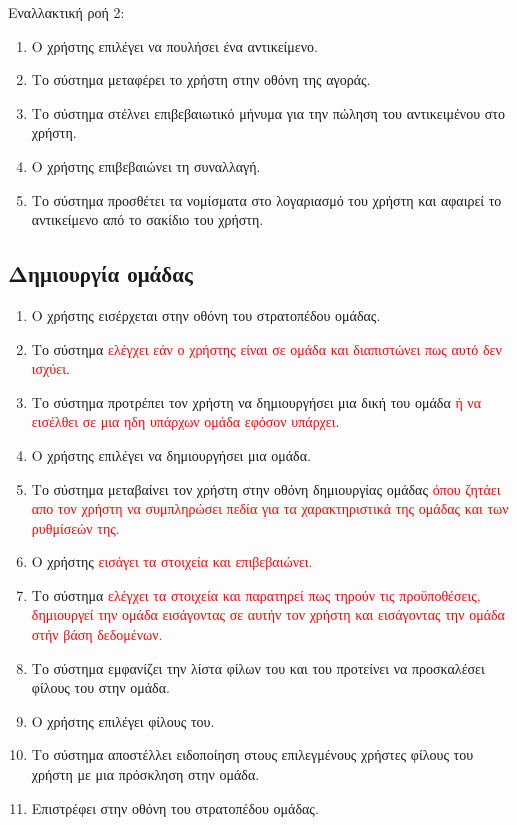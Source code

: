 Εναλλακτική ροή 2:
\begin{enumerate}[label=5.\alph*.,ref=5.\alph*]
\item Ο χρήστης επιλέγει να πουλήσει ένα αντικείμενο.
\item Το σύστημα μεταφέρει το χρήστη στην οθόνη της αγοράς.
\item Το σύστημα στέλνει επιβεβαιωτικό μήνυμα για την πώληση του αντικειμένου στο χρήστη.
\item Ο χρήστης επιβεβαιώνει τη συναλλαγή.
\item Το σύστημα προσθέτει τα νομίσματα στο λογαριασμό του χρήστη και αφαιρεί το αντικείμενο από το σακίδιο του χρήστη.
\end{enumerate}

\newpage
\subsection{Δημιουργία ομάδας}
\label{sec:createclan}
\begin{enumerate}
\item Ο χρήστης εισέρχεται στην οθόνη του στρατοπέδου ομάδας.
\item Το σύστημα \textcolor{red}{ελέγχει εάν ο χρήστης είναι σε ομάδα και διαπιστώνει πως αυτό δεν ισχύει}.
\item Το σύστημα προτρέπει τον χρήστη να δημιουργήσει μια δική του ομάδα \textcolor{red}{ ή να εισέλθει σε μια ηδη υπάρχων ομάδα εφόσον υπάρχει}.
\item Ο χρήστης επιλέγει να δημιουργήσει μια ομάδα.
\item Το σύστημα μεταβαίνει τον χρήστη στην οθόνη δημιουργίας ομάδας \textcolor{red}{όπου ζητάει απο τον χρήστη να συμπληρώσει πεδία για τα χαρακτηριστικά της ομάδας και των ρυθμίσεών της.}
\item Ο χρήστης \textcolor{red}{εισάγει τα στοιχεία και επιβεβαιώνει.}
\item Το σύστημα \textcolor{red}{ελέγχει τα στοιχεία και παρατηρεί πως τηρούν τις προϋποθέσεις, δημιουργεί την ομάδα εισάγοντας σε αυτήν τον χρήστη και εισάγοντας την ομάδα στήν βάση δεδομένων.}
\item Το σύστημα εμφανίζει την λίστα φίλων του και του προτείνει να προσκαλέσει φίλους του στην ομάδα.
\item Ο χρήστης επιλέγει φίλους του.
\item Το σύστημα αποστέλλει ειδοποίηση στους επιλεγμένους χρήστες φίλους του χρήστη με μια πρόσκληση στην ομάδα.
\item Επιστρέφει στην οθόνη του στρατοπέδου ομάδας.
\end{enumerate}

